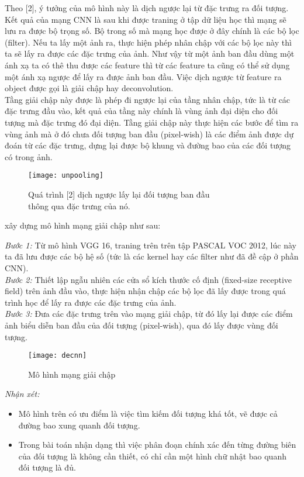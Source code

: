 \documentclass[13pt, a4paper]{extreport}
\begin{document}
\vspace{0.15cm}
\indent Theo [2], ý tưởng của mô hình này là dịch ngược lại từ đặc trưng ra đối tượng. Kết quả của mạng CNN là sau khi được traning ở tập dữ liệu học thì mạng sẽ lưu ra được bộ trọng số. Bộ trong số mà mạng học được ở đây chính là các bộ lọc (filter). Nếu ta lấy một ảnh ra, thực hiện phép nhân chập với các bộ lọc này thì ta sẽ lấy ra được các đặc trưng của ảnh. Như vậy từ một ảnh ban đầu dùng một ánh xạ ta có thê thu được các feature thì từ các feature ta cũng có thể sử dụng một ánh xạ ngược để lấy ra được ảnh ban đầu. Việc dịch ngược từ feature ra object được gọi là giải chập hay deconvolution.\\
\indent Tầng giải chập này được là phép đi ngược lại của tầng nhân chập, tức là từ các đặc trưng đầu vào, kết quả của tầng này chính là vùng ảnh đại diện cho đối tượng mà đặc trưng đó đại diện. Tầng giải chập này thực hiện các bước để tìm ra vùng ảnh mà ở đó chưa đối tượng ban đầu (pixel-wish) là các điểm ảnh được dự đoán từ các đặc trưng, dựng lại được bộ khung và đường bao của các đối tượng có trong ảnh.\\
\begin{figure}[H]
  \centering
    \captionsetup{justification=centering,margin=2cm}
    \texttt{[image: unpooling]}
   \caption{\large Quá trình [2] dịch ngược lấy lại đối tượng ban đầu\\ thông qua đặc trưng của nó.}
\end{figure}

\indent [2] xây dựng mô hình mạng giải chập như sau:

\indent \textit{Bước 1:} Từ mô hình VGG 16, traning trên trên tập PASCAL VOC 2012, lúc này ta đã lưu được các bộ hệ số (tức là các kernel hay các filter như đã đề cập ở phần CNN).\\
\indent \textit{Bước 2:} Thiết lập ngẫu nhiên các cửa sổ kích thước cố định (fixed-size receptive field) trên ảnh đầu vào, thực hiện nhận chập các bộ lọc đã lấy được trong quá trình học để lấy ra được các đặc trưng của ảnh.\\
\indent \textit{Bước 3:} Đưa các đặc trưng trên vào mạng giải chập, từ đó lấy lại được các điểm ảnh biểu diễn ban đầu của đối tượng (pixel-wish), qua đó lấy được vùng đối tượng.
\begin{figure}[H]
  \centering
    \texttt{[image: decnn]}
   \caption{\large Mô hình mạng giải chập}
\end{figure}
\indent \textit{Nhận xét:}
\begin{itemize}
\item Mô hình trên có ưu điểm là việc tìm kiếm đối tượng khá tốt, vẽ được cả đường bao xung quanh đối tượng.
\item Trong bài toán nhận dạng thì việc phân đoạn chính xác đến từng đường biên của đối tượng là không cần thiết, có chỉ cần một hình chữ nhật bao quanh đối tượng là đủ.
\end{itemize}
\end{document}
